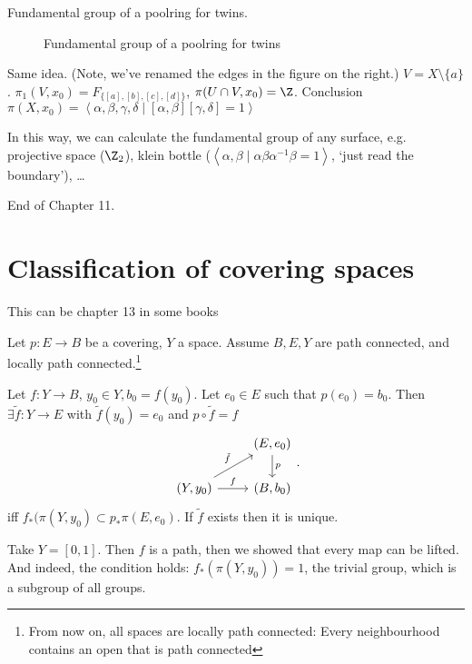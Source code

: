 \begin{eg}
    Fundamental group of a poolring for twins.
\begin{figure}[H]
    \centering
    \caption{Fundamental group of a poolring for twins}
    \label{fig:fundamental-group-of-a-poolring-for-twins}
\end{figure}

Same idea. (Note, we've renamed the edges in the figure on the right.)
$V = X \setminus \{ a\} $. $\pi_1(V, x_0) = F_{\{[a], [b], [c], [d]\}}$, $\pi(U \cap V, x_0) = \Z$.
Conclusion $\pi(X, x_0) = \left<\alpha, \beta, \gamma, \delta  \mid  [\alpha, \beta] [\gamma, \delta] = 1 \right>$

In this way, we can calculate the fundamental group of any surface,  e.g. projective space ($\Z_2$), klein bottle ($\left<\alpha, \beta  \mid \alpha\beta\alpha^{-1}\beta = 1 \right>$, `just read the boundary'), \ldots

\end{eg}

End of Chapter 11.




\setcounter{chapter}{11}
\chapter{Classification of covering spaces}

\begin{note}
    This can be chapter 13 in some books
\end{note}

\setcounter{section}{73}

\begin{lemma}
    Let $p: E \to B $ be a covering, $Y$ a space.
    Assume $B, E, Y$ are path connected, and locally path connected.\footnote{From now on, all spaces are locally path connected: Every neighbourhood contains an open that is path connected}

    Let $f: Y \to  B$, $y_0 \in Y, b_0  = f(y_0)$.
    Let $e_0 \in E$ such that $p(e_0) = b_0$.
    Then $\exists  \tilde{f}: Y \to  E$ with $\tilde{f}(y_0) = e_0$ and $p  \circ  \tilde{f} = f$
    \[
    \begin{tikzcd}
        & (E, e_0) \arrow[d, "p"]\\
        (Y, y_0) \arrow[r, "f"] \arrow[ur, "\tilde{f}"]&(B, b_0)
    \end{tikzcd}
    .\] 
    iff $f_*(\pi(Y, y_0) \subset p_* \pi(E, e_0)$.
    If $\tilde{f}$ exists then it is unique.
\end{lemma}
\begin{eg}
    Take $Y = [0, 1]$.
    Then $f$ is a path, then we showed that every map can be lifted. And indeed, the condition holds: $f_*(\pi(Y, y_0)) = 1$, the trivial group, which is a subgroup of all groups.
\end{eg}

